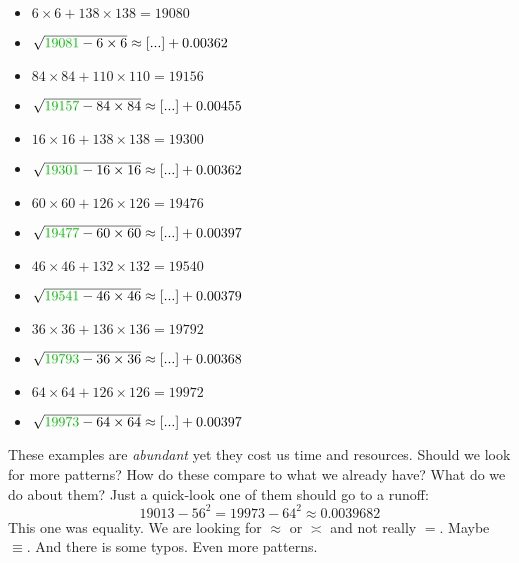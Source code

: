 \documentclass[12pt]{article}
\begin{document}
\begin{multicols}{2}
\begin{itemize}
\item $6\times6 + 138\times138 = 19080$
\item $\sqrt{ {\color{green!75!black}{19081}} - 6\times 6 } \approx [...] + 0.00362$
\item $84\times84 + 110\times110 = 19156$
\item $\sqrt{ {\color{green!75!black}{19157}} - 84\times 84 } \approx [...] + 0.00455$
\item $16\times16 + 138\times138 = 19300$
\item $\sqrt{ {\color{green!75!black}{19301}} - 16\times 16 } \approx [...] + 0.00362$
\item $60\times60 + 126\times126 = 19476$
\item $\sqrt{ {\color{green!75!black}{19477}} - 60\times 60 } \approx [...] + 0.00397$
\item $46\times46 + 132\times132 = 19540$
\item $\sqrt{ {\color{green!75!black}{19541}} - 46\times 46 } \approx [...] + 0.00379$
\item $36\times36 + 136\times136 = 19792$
\item $\sqrt{ {\color{green!75!black}{19793}} - 36\times 36 } \approx [...] + 0.00368$
\item $64\times64 + 126\times126 = 19972$
\item $\sqrt{ {\color{green!75!black}{19973}} - 64\times 64 } \approx [...] + 0.00397$
\end{itemize}
\end{multicols}
\noindent These examples are \textit{abundant} yet they cost us time and resources.  Should we look for more patterns?  How do these compare to what we already have?  What do we do about them?  Just a quick-look one of them should go to a runoff:
$$   19013 - 56^2  =  19973 - 64^2  \approx 0.0039682 $$
This one was equality.  We are looking for $\approx$ or $\asymp$ and not really $=$.  Maybe $\equiv$. And there is some typos.
\newpage
Even more patterns.
\end{document}
